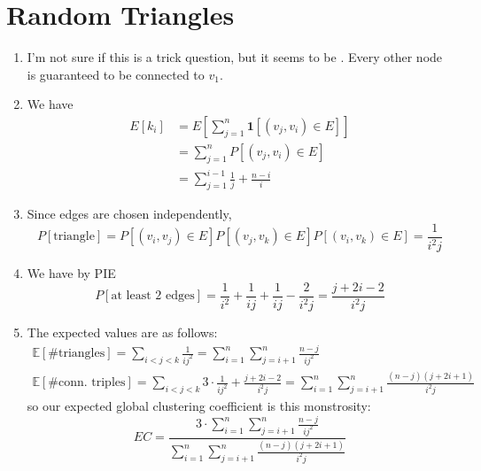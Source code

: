 \documentclass[12pt]{article}
\begin{document}
\pagebreak

\section{Random Triangles}

\begin{enumerate}
      \item I'm not sure if this is a trick question, but it seems to be .
            Every other node is guaranteed to be connected to $v_1$.

      \item We have
            \begin{align*}
                  E[k_i]
                   & = E\left[\sum_{j=1}^{n} \mathbf{1}[(v_j, v_i) \in E]\right] \\
                   & = \sum_{j=1}^{n} P[(v_j, v_i) \in E]                        \\
                   & = \boxed{\sum_{j=1}^{i-1} \frac{1}{j} + \frac{n-i}{i}}
            \end{align*}

      \item Since edges are chosen independently,
            \[P[\text{triangle}] = P[(v_i, v_j) \in E]P[(v_j, v_k) \in E]P[(v_i, v_k) \in E] = \boxed{\frac{1}{i^2j}}\]

      \item We have by PIE
            \[P[\text{at least $2$ edges}]=\frac{1}{i^2}+\frac{1}{ij}+\frac{1}{ij}-\frac{2}{i^2j}=\boxed{\frac{j+2i-2}{i^2j}}\]

      \item The expected values are as follows:
            \begin{gather*}
                  \mathbb{E}[\text{\# triangles}]
                  =\sum_{i < j < k} \frac{1}{ij^2}
                  =\sum_{i=1}^{n} \sum_{j=i+1}^{n} \frac{n-j}{ij^2} \\
                  \mathbb{E}[\text{\# conn. triples}]
                  =\sum_{i < j < k} 3 \cdot \frac{1}{ij^2} + \frac{j+2i-2}{i^2j}
                  = \sum_{i=1}^{n} \sum_{j=i+1}^{n} \frac{(n-j)(j+2i+1)}{i^2j}
            \end{gather*}
            so our expected global clustering coefficient is this monstrosity:
            \[EC=\frac{3 \cdot \sum_{i=1}^{n} \sum_{j=i+1}^{n} \frac{n-j}{ij^2}}
                  {\sum_{i=1}^{n} \sum_{j=i+1}^{n} \frac{(n-j)(j+2i+1)}{i^2j}}\]
\end{enumerate}
\end{document}
